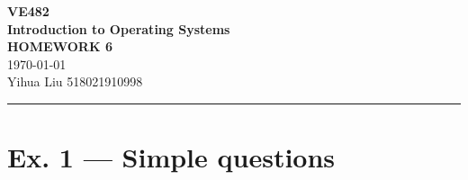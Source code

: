 \documentclass[a4paper]{article}
\begin{document}
\begin{center}
    \huge
    \textbf{VE482\\Introduction to Operating Systems\\}
    \Large
    \vspace{15pt}
    \uppercase{\textbf{Homework 6}}\\
    \large
    \vspace{5pt}\today\\
    \vspace{5pt}
    Yihua Liu 518021910998
    \vspace{5pt}
    \rule[-5pt]{.97\linewidth}{0.05em}
\end{center}
\section*{Ex. 1 — Simple questions}
\end{document}
